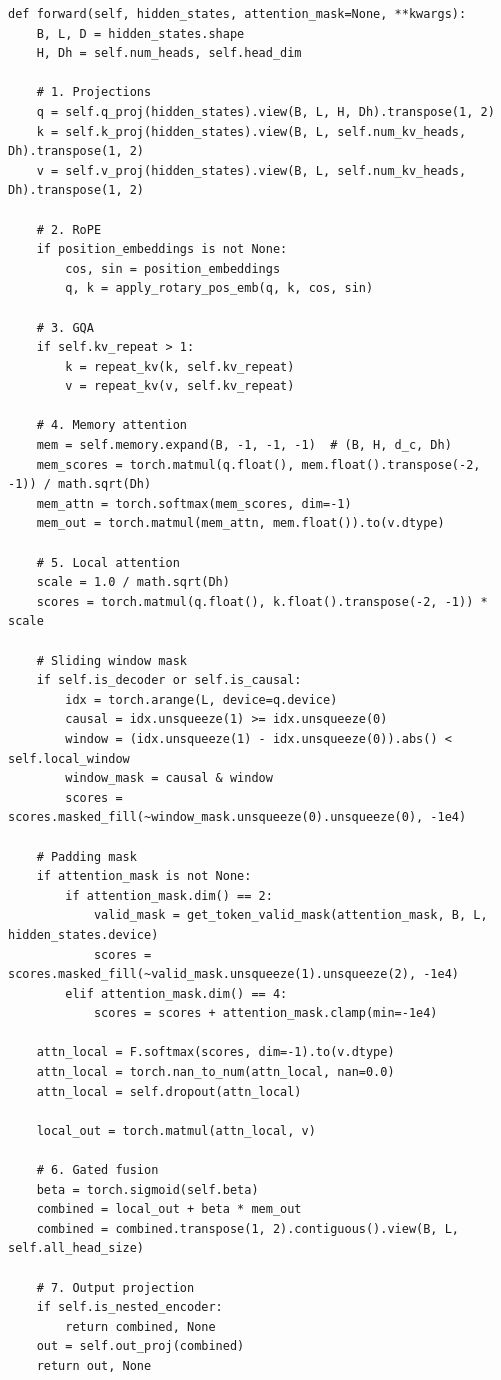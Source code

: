 \begin{lstlisting}
def forward(self, hidden_states, attention_mask=None, **kwargs):
    B, L, D = hidden_states.shape
    H, Dh = self.num_heads, self.head_dim
    
    # 1. Projections
    q = self.q_proj(hidden_states).view(B, L, H, Dh).transpose(1, 2)
    k = self.k_proj(hidden_states).view(B, L, self.num_kv_heads, Dh).transpose(1, 2)
    v = self.v_proj(hidden_states).view(B, L, self.num_kv_heads, Dh).transpose(1, 2)
    
    # 2. RoPE
    if position_embeddings is not None:
        cos, sin = position_embeddings
        q, k = apply_rotary_pos_emb(q, k, cos, sin)
    
    # 3. GQA
    if self.kv_repeat > 1:
        k = repeat_kv(k, self.kv_repeat)
        v = repeat_kv(v, self.kv_repeat)
    
    # 4. Memory attention
    mem = self.memory.expand(B, -1, -1, -1)  # (B, H, d_c, Dh)
    mem_scores = torch.matmul(q.float(), mem.float().transpose(-2, -1)) / math.sqrt(Dh)
    mem_attn = torch.softmax(mem_scores, dim=-1)
    mem_out = torch.matmul(mem_attn, mem.float()).to(v.dtype)
    
    # 5. Local attention
    scale = 1.0 / math.sqrt(Dh)
    scores = torch.matmul(q.float(), k.float().transpose(-2, -1)) * scale
    
    # Sliding window mask
    if self.is_decoder or self.is_causal:
        idx = torch.arange(L, device=q.device)
        causal = idx.unsqueeze(1) >= idx.unsqueeze(0)
        window = (idx.unsqueeze(1) - idx.unsqueeze(0)).abs() < self.local_window
        window_mask = causal & window
        scores = scores.masked_fill(~window_mask.unsqueeze(0).unsqueeze(0), -1e4)
    
    # Padding mask
    if attention_mask is not None:
        if attention_mask.dim() == 2:
            valid_mask = get_token_valid_mask(attention_mask, B, L, hidden_states.device)
            scores = scores.masked_fill(~valid_mask.unsqueeze(1).unsqueeze(2), -1e4)
        elif attention_mask.dim() == 4:
            scores = scores + attention_mask.clamp(min=-1e4)
    
    attn_local = F.softmax(scores, dim=-1).to(v.dtype)
    attn_local = torch.nan_to_num(attn_local, nan=0.0)
    attn_local = self.dropout(attn_local)
    
    local_out = torch.matmul(attn_local, v)
    
    # 6. Gated fusion
    beta = torch.sigmoid(self.beta)
    combined = local_out + beta * mem_out
    combined = combined.transpose(1, 2).contiguous().view(B, L, self.all_head_size)
    
    # 7. Output projection
    if self.is_nested_encoder:
        return combined, None
    out = self.out_proj(combined)
    return out, None
\end{lstlisting}

